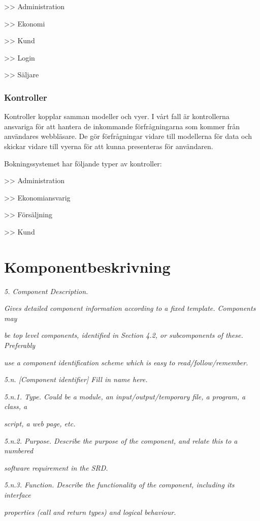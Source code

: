 \documentclass[a4paper, twoside, 11pt, titlepage]{article}
\begin{document}
		>> Administration

		>> Ekonomi

		>> Kund

		>> Login

		>> Säljare

		\subsubsection{Kontroller}


		Kontroller kopplar samman modeller och vyer. I vårt fall är kontrollerna ansvariga för att hantera de inkommande förfrågningarna som kommer från användares webbläsare. De gör förfrågningar vidare till modellerna för data och skickar vidare till vyerna för att kunna presenteras för användaren.

		Bokningssystemet har följande typer av kontroller:

		>> Administration

		>> Ekonomiansvarig

		>> Försäljning

		>> Kund

\clearpage
\section{Komponentbeskrivning}


\emph{5. Component Description.}

\emph{Gives detailed component information according to a fixed template. Components may}

\emph{be top level components, identified in Section 4.2, or subcomponents of these. Preferably}

\emph{use a component identification scheme which is easy to read/follow/remember.}

\emph{5.n. [Component identifier] Fill in name here.}

\emph{5.n.1. Type. Could be a module, an input/output/temporary file, a program, a class, a}

\emph{script, a web page, etc.}

\emph{5.n.2. Purpose. Describe the purpose of the component, and relate this to a numbered}

\emph{software requirement in the SRD.}

\emph{5.n.3. Function. Describe the functionality of the component, including its interface}

\emph{properties (call and return types) and logical behaviour.}
\end{document}
